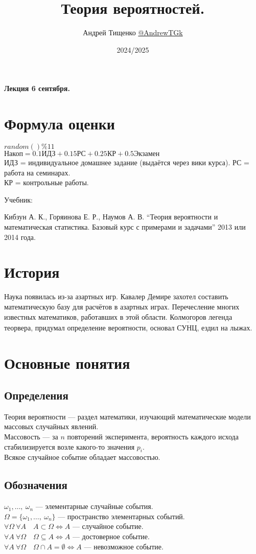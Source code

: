 \documentclass[12pt, a4paper]{article}
\title{Теория вероятностей.}
\author{Андрей Тищенко \href{https://t.me/AndrewTGk}{@AndrewTGk}}
\date{2024/2025}
\begin{document}
    \maketitle
    \begin{center}
        \textbf{Лекция 6 сентября.}
    \end{center}
    \section*{Формула оценки}
    $random()\%11$\\
    $\text{Накоп} = 0.1\text{ИДЗ} + 0.15\text{РС} + 0.25\text{КР} + 0.5\text{Экзамен}$\\
    ИДЗ = индивидуальное домашнее задание (выдаётся через вики курса).
    РС = работа на семинарах.\\
    КР = контрольные работы.
    \begin{center}
        Учебник:
    \end{center}
    Кибзун А. К., Горяинова Е. Р., Наумов А. В. ``Теория 
    вероятности и математическая статистика. Базовый курс 
    с примерами и задачами'' 2013 или 2014 года.
    \section*{История}
    Наука появилась из-за азартных игр. Кавалер Демире захотел составить 
    математическую базу для расчётов в азартных играх. Перечесление многих 
    известных математиков, работавших в этой области. $\underline{\text{Колмогоров}}$ легенда
    теорвера, придумал определение вероятности, основал СУНЦ, ездил на лыжах.\\
    \section*{Основные понятия}
    \subsection*{Определения}
    $\textit{Теория вероятности}$ --- раздел математики, изучающий математические модели массовых случайных явлений.\\
    $\textit{Массовость}$ --- за $n$ повторений эксперимента, вероятность каждого исхода стабилизируется возле какого-то значения $p_i$.\\
    Всякое случайное событие обладает массовостью.
    \subsection*{Обозначения}
    $\omega_1,\dots,\ \omega_n$ --- элементарные случайные события.\\
    $\Omega = \{\omega_1,\dots,\ \omega_n\}$ --- пространство элементарных событий.\\
    $\forall \Omega\ \forall A\quad A\subset \Omega\Leftrightarrow A$ --- случайное событие.\\
    $\forall A\ \forall \Omega\quad  \Omega\subseteq A\Leftrightarrow A$ --- достоверное событие.\\
    $\forall A\ \forall \Omega\quad \Omega\cap A = \emptyset\Leftrightarrow A$ --- невозможное событие.\\
\end{document}

